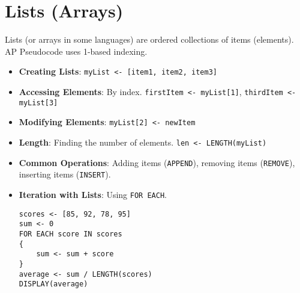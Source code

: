 \documentclass[11pt,oneside]{book}
\begin{document}
\section{Lists (Arrays)}
\label{sec:lists}
Lists (or arrays in some languages) are ordered collections of items (elements). AP Pseudocode uses 1-based indexing.
\begin{itemize}
    \item \textbf{Creating Lists}: \texttt{myList <- [item1, item2, item3]}
    \item \textbf{Accessing Elements}: By index. \texttt{firstItem <- myList[1]}, \texttt{thirdItem <- myList[3]}
    \item \textbf{Modifying Elements}: \texttt{myList[2] <- newItem}
    \item \textbf{Length}: Finding the number of elements. \texttt{len <- LENGTH(myList)}
    \item \textbf{Common Operations}: Adding items (\texttt{APPEND}), removing items (\texttt{REMOVE}), inserting items (\texttt{INSERT}).
    \item \textbf{Iteration with Lists}: Using \texttt{FOR EACH}.
    \begin{lstlisting}[language=APCSP, label={lst:list_iteration}, caption={AP Pseudocode: List Iteration}]
scores <- [85, 92, 78, 95]
sum <- 0
FOR EACH score IN scores
{
    sum <- sum + score
}
average <- sum / LENGTH(scores)
DISPLAY(average)
\end{lstlisting}
\end{itemize}
\end{document}
